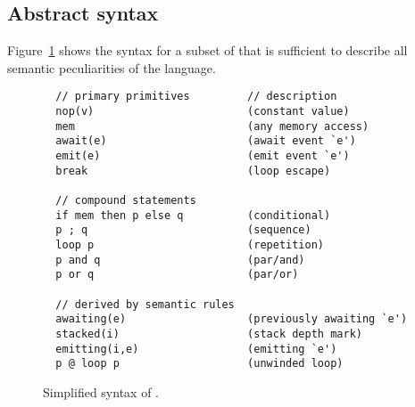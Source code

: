 \begin{comment}

\documentclass[11pt,a4paper]{article}
\usepackage[body={6.0in, 8.2in},left=1.25in,right=1.25in]{geometry}

\usepackage{fancyvrb}
\usepackage{verbatim}

\usepackage[pdftex]{graphicx}
\usepackage{subfigure}

\usepackage{listings}
\lstset{frame=tb}
\lstset{basicstyle=\scriptsize}
\lstset{tabsize=4}

\usepackage{amssymb}
\usepackage{amsmath}
\usepackage{amsfonts}
\usepackage{amsthm}

\newcommand{\1}{\;}
\newcommand{\2}{\;\;}
\newcommand{\3}{\;\;\;}
\newcommand{\5}{\;\;\;\;\;}
\newcommand{\ten}{\5\5}
\newcommand{\twenty}{\ten\ten}

\newcommand{\CEU}{\textsc{C\'{e}u}}
\newcommand{\code}[1] {{\small{\texttt{#1}}}}

\newcommand{\ST}{\xrightarrow[i]{}}
\newcommand{\BT}{\xRightarrow[(i,E)]{}}



\section{Formalization of \CEU}

\end{comment}

\subsection{Abstract syntax}
\label{sec.sem.syntax}

Figure~\ref{lst:ceu:syn} shows the syntax for a subset of \CEU that is 
sufficient to describe all semantic peculiarities of the language.

\begin{figure}[t]
{\small
\begin{verbatim}
  // primary primitives         // description
  nop(v)                        (constant value)
  mem                           (any memory access)
  await(e)                      (await event `e')
  emit(e)                       (emit event `e')
  break                         (loop escape)

  // compound statements
  if mem then p else q          (conditional)
  p ; q                         (sequence)
  loop p                        (repetition)
  p and q                       (par/and)
  p or q                        (par/or)

  // derived by semantic rules
  awaiting(e)                   (previously awaiting `e')
  stacked(i)                    (stack depth mark)
  emitting(i,e)                 (emitting `e')
  p @ loop p                    (unwinded loop)
\end{verbatim}
}%
\caption{ Simplified syntax of \CEU.
\label{lst:ceu:syn}
}
\end{figure}


